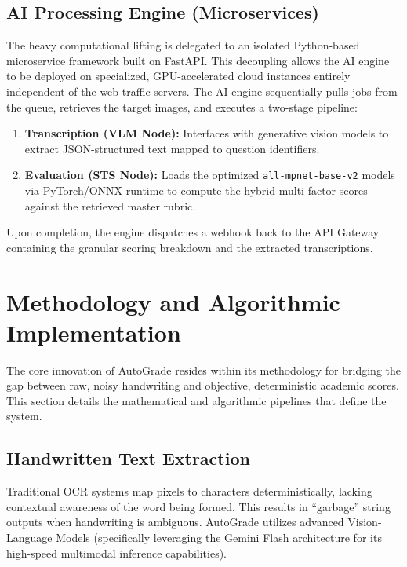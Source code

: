 \documentclass[conference]{IEEEtran}
\begin{document}
\subsection{AI Processing Engine (Microservices)}
The heavy computational lifting is delegated to an isolated Python-based microservice framework built on FastAPI. This decoupling allows the AI engine to be deployed on specialized, GPU-accelerated cloud instances entirely independent of the web traffic servers. The AI engine sequentially pulls jobs from the queue, retrieves the target images, and executes a two-stage pipeline:
\begin{enumerate}
    \item \textbf{Transcription (VLM Node):} Interfaces with generative vision models to extract JSON-structured text mapped to question identifiers.
    \item \textbf{Evaluation (STS Node):} Loads the optimized \texttt{all-mpnet-base-v2} models via PyTorch/ONNX runtime to compute the hybrid multi-factor scores against the retrieved master rubric.
\end{enumerate}
Upon completion, the engine dispatches a webhook back to the API Gateway containing the granular scoring breakdown and the extracted transcriptions.

\section{Methodology and Algorithmic Implementation}
The core innovation of AutoGrade resides within its methodology for bridging the gap between raw, noisy handwriting and objective, deterministic academic scores. This section details the mathematical and algorithmic pipelines that define the system.

\subsection{Handwritten Text Extraction}
Traditional OCR systems map pixels to characters deterministically, lacking contextual awareness of the word being formed. This results in ``garbage'' string outputs when handwriting is ambiguous. AutoGrade utilizes advanced Vision-Language Models (specifically leveraging the Gemini Flash architecture for its high-speed multimodal inference capabilities). 
\end{document}
